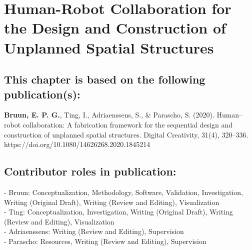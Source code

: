 
\graphicspath{{./\figurefolder/3HumanRobot/}}



\chapter{Human-Robot Collaboration for the Design and Construction of Unplanned Spatial Structures} \label{chap:3_humanrobot}

\thispagestyle{empty}

\vfill 
\section*{\normalsize\textmd{This chapter is based on the following publication(s):}}
    \vspace{-0.3cm}
    \textbf{Bruun, E. P. G.}, Ting, I., Adriaenssens, S., \& Parascho, S. (2020). Human–robot collaboration: A fabrication framework for the sequential design and construction of unplanned spatial structures. Digital Creativity, 31(4), 320–336. https://doi.org/10.1080/14626268.2020.1845214

\section*{\normalsize\textmd{Contributor roles in publication:}}
    \vspace{-0.3cm}\noindent
    - Bruun: Conceptualization, Methodology, Software, Validation, Investigation, Writing (Original Draft), Writing (Review and Editing), Visualization\\
    - Ting: Conceptualization, Investigation, Writing (Original Draft), Writing (Review and Editing), Visualization \\
    - Adriaenssens: Writing (Review and Editing), Supervision \\
    - Parascho: Resources, Writing (Review and Editing), Supervision \\
    

